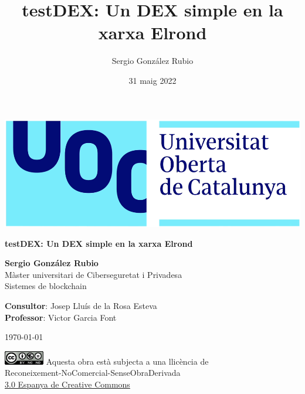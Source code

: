 \documentclass[11pt,a4paper]{article}
\author{Sergio González Rubio}
\title{testDEX: Un DEX simple en la xarxa Elrond}
\date{31 maig 2022}
\begin{document}
\begin{titlepage}
\includegraphics[scale=0.2,right,valign=t]{uoc-logo.png}
\vspace*{\fill}
\begin{flushleft}
{\LARGE \textbf{testDEX: Un DEX simple en la xarxa Elrond}}
\end{flushleft}
\begin{flushleft}
\textbf{Sergio González Rubio}\\
Màster universitari de Ciberseguretat i Privadesa\\
Sistemes de blockchain
\end{flushleft}
\begin{flushleft}
\textbf{Consultor}: Josep Lluís de la Rosa Esteva\\
\textbf{Professor}: Victor Garcia Font
\end{flushleft}
\begin{flushleft}
\today
\end{flushleft}
\end{titlepage}


\begin{titlepage}
\vspace*{\fill}
\begin{flushleft}
\includegraphics[scale=1,left]{licencia-cc.png}
Aquesta obra està subjecta a una llicència de\\
Reconeixement-NoComercial-SenseObraDerivada\\
\href{http://creativecommons.org/licenses/by-nc-nd/3.0/es/}{3.0 Espanya de Creative Commons}
\end{flushleft}
\end{titlepage}
\end{document}
